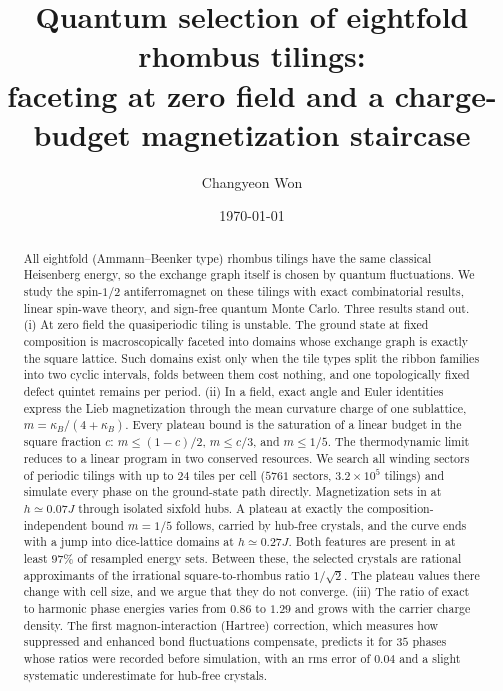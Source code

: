 \documentclass[aps,prb,twocolumn,superscriptaddress,floatfix]{revtex4-2}
\begin{document}
\title{Quantum selection of eightfold rhombus tilings:\\ faceting at zero field and a charge-budget magnetization staircase}

\author{Changyeon Won}

\date{\today}

\begin{abstract}
All eightfold (Ammann--Beenker type) rhombus tilings have the same classical Heisenberg energy, so the exchange graph itself is chosen by quantum fluctuations. We study the spin-$1/2$ antiferromagnet on these tilings with exact combinatorial results, linear spin-wave theory, and sign-free quantum Monte Carlo. Three results stand out. (i) At zero field the quasiperiodic tiling is unstable. The ground state at fixed composition is macroscopically faceted into domains whose exchange graph is exactly the square lattice. Such domains exist only when the tile types split the ribbon families into two cyclic intervals, folds between them cost nothing, and one topologically fixed defect quintet remains per period. (ii) In a field, exact angle and Euler identities express the Lieb magnetization through the mean curvature charge of one sublattice, $m=\kappa_B/(4+\kappa_B)$. Every plateau bound is the saturation of a linear budget in the square fraction $c$: $m\le(1-c)/2$, $m\le c/3$, and $m\le 1/5$. The thermodynamic limit reduces to a linear program in two conserved resources. We search all winding sectors of periodic tilings with up to $24$ tiles per cell ($5761$ sectors, $3.2\times10^5$ tilings) and simulate every phase on the ground-state path directly. Magnetization sets in at $h\simeq0.07J$ through isolated sixfold hubs. A plateau at exactly the composition-independent bound $m=1/5$ follows, carried by hub-free crystals, and the curve ends with a jump into dice-lattice domains at $h\simeq0.27J$. Both features are present in at least $97\%$ of resampled energy sets. Between these, the selected crystals are rational approximants of the irrational square-to-rhombus ratio $1/\sqrt2$. The plateau values there change with cell size, and we argue that they do not converge. (iii) The ratio of exact to harmonic phase energies varies from $0.86$ to $1.29$ and grows with the carrier charge density. The first magnon-interaction (Hartree) correction, which measures how suppressed and enhanced bond fluctuations compensate, predicts it for $35$ phases whose ratios were recorded before simulation, with an rms error of $0.04$ and a slight systematic underestimate for hub-free crystals.
\end{abstract}
\end{document}
